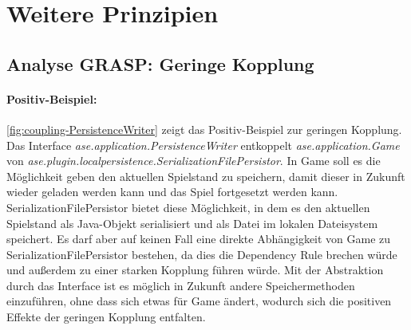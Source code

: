 \chapter{Weitere Prinzipien} 

\section{Analyse GRASP: Geringe Kopplung}

\subsubsection{Positiv-Beispiel:}

\autoref{fig:coupling-PersistenceWriter} zeigt das Positiv-Beispiel zur geringen Kopplung. \\
Das Interface \textit{ase.application.PersistenceWriter} entkoppelt \textit{ase.application.Game} von 
\textit{ase.plugin.localpersistence.SerializationFilePersistor}. In Game soll es die Möglichkeit geben den aktuellen 
Spielstand zu speichern, damit dieser in Zukunft wieder geladen werden kann und das Spiel fortgesetzt werden kann. 
SerializationFilePersistor bietet diese Möglichkeit, in dem es den aktuellen Spielstand als Java-Objekt serialisiert 
und als Datei im lokalen Dateisystem speichert. Es darf aber auf keinen Fall eine direkte Abhängigkeit von 
Game zu SerializationFilePersistor bestehen, da dies die Dependency Rule brechen würde und außerdem zu einer starken 
Kopplung führen würde. Mit der Abstraktion durch das Interface ist es möglich in Zukunft andere Speichermethoden einzuführen,
ohne dass sich etwas für Game ändert, wodurch sich die positiven Effekte der geringen Kopplung entfalten. 

